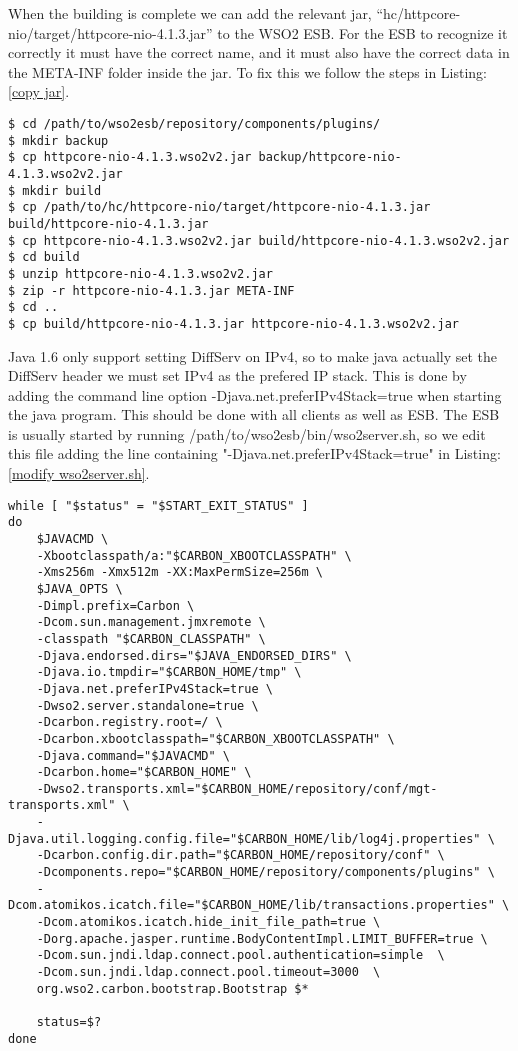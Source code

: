 	When the building is complete we can add the relevant jar, “hc/httpcore-nio/target/httpcore-nio-4.1.3.jar” to the WSO2 ESB. For the ESB to recognize it correctly it must have the correct name, and it must also have the correct data in the META-INF folder inside the jar. To fix this we follow the steps in Listing:\ref{copy jar}.
\begin{lstlisting}[frame=single, caption={Create WSO2 compatible jars}, label=copy jar, breaklines=true]
$ cd /path/to/wso2esb/repository/components/plugins/
$ mkdir backup
$ cp httpcore-nio-4.1.3.wso2v2.jar backup/httpcore-nio-4.1.3.wso2v2.jar
$ mkdir build
$ cp /path/to/hc/httpcore-nio/target/httpcore-nio-4.1.3.jar build/httpcore-nio-4.1.3.jar
$ cp httpcore-nio-4.1.3.wso2v2.jar build/httpcore-nio-4.1.3.wso2v2.jar
$ cd build
$ unzip httpcore-nio-4.1.3.wso2v2.jar
$ zip -r httpcore-nio-4.1.3.jar META-INF
$ cd ..
$ cp build/httpcore-nio-4.1.3.jar httpcore-nio-4.1.3.wso2v2.jar
\end{lstlisting}

	Java 1.6 only support setting DiffServ on IPv4, so to make java actually set the DiffServ header we must set IPv4 as the prefered IP stack. This is done by adding the command line option -Djava.net.preferIPv4Stack=true when starting the java program. This should be done with all clients as well as ESB. The ESB is usually started by running /path/to/wso2esb/bin/wso2server.sh, so we edit this file adding the line containing "-Djava.net.preferIPv4Stack=true" in Listing:\ref{modify wso2server.sh}.

\begin{lstlisting}[frame=single, caption={Changes made to wso2server.sh}, label=modify wso2server.sh, breaklines=true]
while [ "$status" = "$START_EXIT_STATUS" ]
do
    $JAVACMD \
    -Xbootclasspath/a:"$CARBON_XBOOTCLASSPATH" \
    -Xms256m -Xmx512m -XX:MaxPermSize=256m \
    $JAVA_OPTS \
    -Dimpl.prefix=Carbon \
    -Dcom.sun.management.jmxremote \
    -classpath "$CARBON_CLASSPATH" \
    -Djava.endorsed.dirs="$JAVA_ENDORSED_DIRS" \
    -Djava.io.tmpdir="$CARBON_HOME/tmp" \
    -Djava.net.preferIPv4Stack=true \
    -Dwso2.server.standalone=true \
    -Dcarbon.registry.root=/ \
    -Dcarbon.xbootclasspath="$CARBON_XBOOTCLASSPATH" \
    -Djava.command="$JAVACMD" \
    -Dcarbon.home="$CARBON_HOME" \
    -Dwso2.transports.xml="$CARBON_HOME/repository/conf/mgt-transports.xml" \
    -Djava.util.logging.config.file="$CARBON_HOME/lib/log4j.properties" \
    -Dcarbon.config.dir.path="$CARBON_HOME/repository/conf" \
    -Dcomponents.repo="$CARBON_HOME/repository/components/plugins" \
    -Dcom.atomikos.icatch.file="$CARBON_HOME/lib/transactions.properties" \
    -Dcom.atomikos.icatch.hide_init_file_path=true \
    -Dorg.apache.jasper.runtime.BodyContentImpl.LIMIT_BUFFER=true \
    -Dcom.sun.jndi.ldap.connect.pool.authentication=simple  \
    -Dcom.sun.jndi.ldap.connect.pool.timeout=3000  \
    org.wso2.carbon.bootstrap.Bootstrap $*

    status=$?
done
\end{lstlisting}


